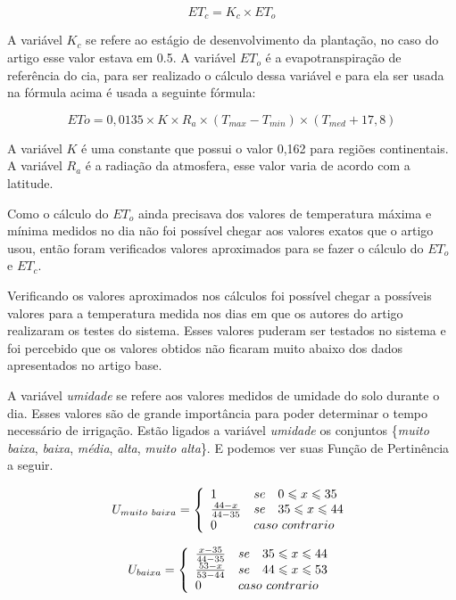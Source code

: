 \documentclass[
	article,			%
	11pt,				%
	oneside,			%
	a4paper,			%
	english,			%
	brazil,				%
	sumario=tradicional
	]{abntex2}
\begin{document}
\begin{multicols}{2}
$$ 
  ET_c = K_c \times ET_o 
$$


A variável $K_c$ se refere ao estágio de desenvolvimento da plantação, no caso do artigo esse valor estava em 0.5. A variável $ET_o$ é a evapotranspiração de referência do cia, para ser realizado o cálculo dessa variável e para ela ser usada na fórmula acima é usada a seguinte fórmula:

$$
  ETo = 0,0135 \times K \times R_a \times (T_{max} - T_{min}) \times (T_{med} + 17,8)
$$

A variável $K$ é uma constante que possui o valor 0,162 para regiões continentais. A variável $R_a$ é a radiação da atmosfera, esse valor varia de acordo com a latitude.

Como o cálculo do $ET_o$ ainda precisava dos valores de temperatura máxima e mínima medidos no dia não foi possível chegar aos valores exatos que o artigo usou, então foram verificados valores aproximados para se fazer o cálculo do $ET_o$ e $ET_c$.

Verificando os valores aproximados nos cálculos foi possível chegar a possíveis valores para a temperatura medida nos dias em que os autores do artigo realizaram os testes do sistema. Esses valores puderam ser testados no sistema e foi percebido que os valores obtidos não ficaram muito abaixo dos dados apresentados no artigo base.

A variável \textit{umidade} se refere aos valores medidos de umidade do solo durante o dia. Esses valores são de grande importância para poder determinar o tempo necessário de irrigação. Estão ligados a variável \textit{umidade} os conjuntos \{\textit{muito baixa}, \textit{baixa}, \textit{média}, \textit{alta}, \textit{muito alta}\}. E podemos ver suas Função de Pertinência a seguir.

$$
  U_{muito~baixa} = \left\{
  \begin{array}{lll}
  1 & se & 0 \leqslant x \leqslant 35 \\
  \frac{44 - x}{44 - 35} & se & 35 \leqslant x \leqslant 44 \\
  0 & \multicolumn{2}{l}{caso~contrario}
  \end{array}
  \right.
$$

$$
  U_{baixa} = \left\{
  \begin{array}{lll}
  \frac{x - 35}{44 - 35} & se & 35 \leqslant x \leqslant 44 \\
  \frac{53 - x}{53 - 44} & se & 44 \leqslant x \leqslant 53 \\
  0 & \multicolumn{2}{l}{caso~contrario}
  \end{array}
  \right.
$$


\end{multicols}
\end{document}

